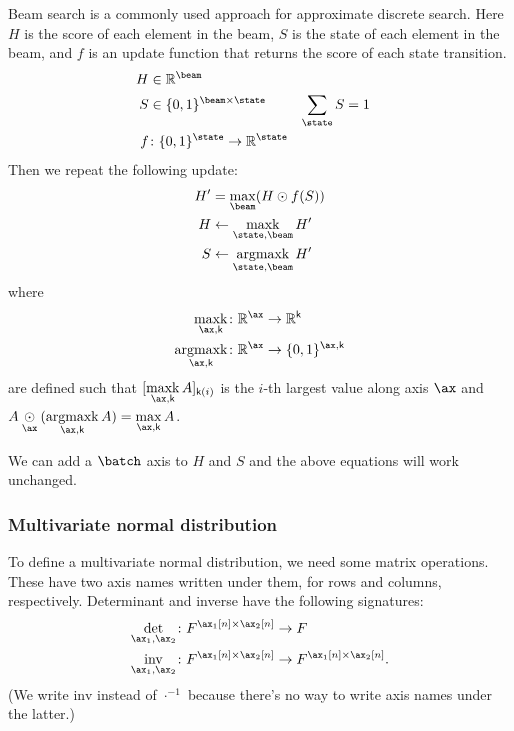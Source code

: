 \documentclass{article}
\newcommand{\reals}{\mathbb{R}}
\begin{document}

Beam search is a commonly used approach for approximate discrete search. Here $H$ is the score of each element in the beam, $S$ is the state of each element in the beam, and $f$ is an update function that returns the score of each state transition. 
\begin{align*} 
H &\in \reals^{\beam} \\
S &\in \{0, 1\}^{\beam \times \state} & \nsum{\state} S &= 1 \\
f &\colon \{0, 1\}^{\state} \rightarrow \reals^{\state} \\
\end{align*}
Then we repeat the following update:
\begin{align*}
H' &= \nfun{\beam}{max} (H \odot f(S)) \\
H &\leftarrow \nfun{\state,\beam}{maxk} H' \\
S &\leftarrow \nfun{\state,\beam}{argmaxk} H'
\end{align*}
where
\begin{align*}
\nfun{\ax,\name{k}}{maxk} \colon \reals^{\ax} &\rightarrow \reals^{\name{k}} \\
\nfun{\ax,\name{k}}{argmaxk} \colon \reals^{\ax} &\rightarrow \{0,1\}^{\ax,\name{k}}
\end{align*}
are defined such that $[\nfun{\ax,\name{k}}{maxk} A]_{\name{k}(i)}$ is the $i$-th largest value along axis $\ax$ and $A \ndot{\ax} (\nfun{\ax,\name{k}}{argmaxk}{A}) = \nfun{\ax,\name{k}}{max} A$.

We can add a $\batch$ axis to $H$ and $S$ and the above equations will work unchanged.

\subsubsection{Multivariate normal distribution}

To define a multivariate normal distribution, we need some matrix operations. These have two axis names written under them, for rows and columns, respectively. Determinant and inverse have the following signatures:
\begin{align*}
\nfun{\ax_1,\ax_2}{det} \colon F^{\ax_1[n] \times \ax_2[n]} &\rightarrow F \\
\nfun{\ax_1,\ax_2}{inv} \colon F^{\ax_1[n] \times \ax_2[n]} &\rightarrow F^{\ax_1[n] \times \ax_2[n]}.
\end{align*}
(We write $\text{inv}$ instead of $\cdot^{-1}$ because there's no way to write axis names under the latter.)
\end{document}
